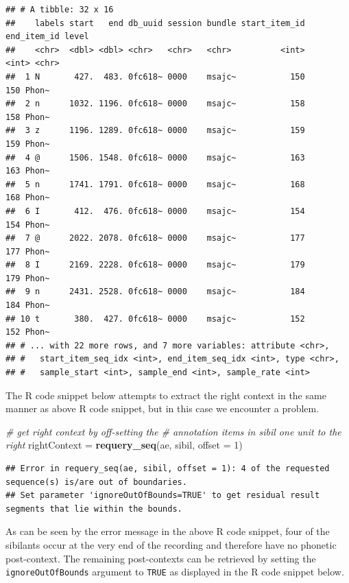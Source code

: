 \documentclass[]{book}
\newenvironment{Shaded}{\begin{snugshade}}{\end{snugshade}}
\newcommand{\CommentTok}[1]{\textcolor[rgb]{0.56,0.35,0.01}{\textit{#1}}}
\newcommand{\DataTypeTok}[1]{\textcolor[rgb]{0.13,0.29,0.53}{#1}}
\newcommand{\DecValTok}[1]{\textcolor[rgb]{0.00,0.00,0.81}{#1}}
\newcommand{\KeywordTok}[1]{\textcolor[rgb]{0.13,0.29,0.53}{\textbf{#1}}}
\newcommand{\NormalTok}[1]{#1}
\newcommand{\StringTok}[1]{\textcolor[rgb]{0.31,0.60,0.02}{#1}}
\begin{document}
\begin{verbatim}
## # A tibble: 32 x 16
##    labels start   end db_uuid session bundle start_item_id end_item_id level
##    <chr>  <dbl> <dbl> <chr>   <chr>   <chr>          <int>       <int> <chr>
##  1 N       427.  483. 0fc618~ 0000    msajc~           150         150 Phon~
##  2 n      1032. 1196. 0fc618~ 0000    msajc~           158         158 Phon~
##  3 z      1196. 1289. 0fc618~ 0000    msajc~           159         159 Phon~
##  4 @      1506. 1548. 0fc618~ 0000    msajc~           163         163 Phon~
##  5 n      1741. 1791. 0fc618~ 0000    msajc~           168         168 Phon~
##  6 I       412.  476. 0fc618~ 0000    msajc~           154         154 Phon~
##  7 @      2022. 2078. 0fc618~ 0000    msajc~           177         177 Phon~
##  8 I      2169. 2228. 0fc618~ 0000    msajc~           179         179 Phon~
##  9 n      2431. 2528. 0fc618~ 0000    msajc~           184         184 Phon~
## 10 t       380.  427. 0fc618~ 0000    msajc~           152         152 Phon~
## # ... with 22 more rows, and 7 more variables: attribute <chr>,
## #   start_item_seq_idx <int>, end_item_seq_idx <int>, type <chr>,
## #   sample_start <int>, sample_end <int>, sample_rate <int>
\end{verbatim}

The R code snippet below attempts to extract the right context in the same manner as above R code snippet, but in this case we encounter a problem.

\begin{Shaded}
\begin{Highlighting}[]
\CommentTok{# get right context by off-setting the }
\CommentTok{# annotation items in sibil one unit to the right}
\NormalTok{rightContext =}\StringTok{ }\KeywordTok{requery_seq}\NormalTok{(ae, sibil, }\DataTypeTok{offset =} \DecValTok{1}\NormalTok{)}
\end{Highlighting}
\end{Shaded}

\begin{verbatim}
## Error in requery_seq(ae, sibil, offset = 1): 4 of the requested sequence(s) is/are out of boundaries.
## Set parameter 'ignoreOutOfBounds=TRUE' to get residual result segments that lie within the bounds.
\end{verbatim}

As can be seen by the error message in the above R code snippet, four of the sibilants occur at the very end of the recording and therefore have no phonetic post-context. The remaining post-contexts can be retrieved by setting the \texttt{ignoreOutOfBounds} argument to \texttt{TRUE} as displayed in the R code snippet below.
\end{document}
